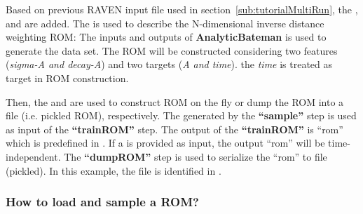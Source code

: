 Based on previous RAVEN input file used in section~\ref{sub:tutorialMultiRun}, the , 
and  are added. The  is used to describe the N-dimensional inverse distance weighting
ROM:
The inputs and outputs of \textbf{AnalyticBateman} is used to generate the data set. The ROM will be constructed considering
two features (\textit{sigma-A and decay-A}) and two targets (\textit{A and time}). \nb the \textit{time} is treated
as target in ROM construction.

Then, the  and  are used to construct ROM on the fly or dump the ROM into a file
(i.e. pickled ROM), respectively.
The  generated by the \textbf{``sample''} step is used as input of the \textbf{``trainROM''}
step. The output of the \textbf{``trainROM''} is ``rom'' which is predefined in . If a 
is provided as input, the output ``rom'' will be time-independent. The \textbf{``dumpROM''} step is used to serialize
the ``rom'' to file (pickled). In this example, the file is identified in .












\subsubsection{How to load and sample a ROM?}











